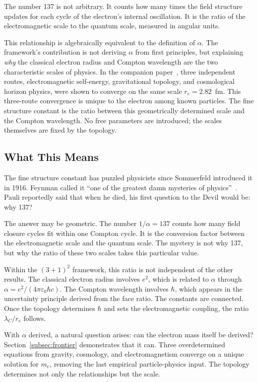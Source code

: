 \documentclass[aps,prd,preprint,superscriptaddress,showpacs,preprintnumbers,amsmath,amssymb,nofootinbib]{revtex4-2}
\begin{document}
The number 137 is not arbitrary. It counts how many times the field structure updates for each cycle of the electron's internal oscillation. It is the ratio of the electromagnetic scale to the quantum scale, measured in angular units.

This relationship is algebraically equivalent to the definition of $\alpha$. The framework's contribution is not deriving $\alpha$ from first principles, but explaining \emph{why} the classical electron radius and Compton wavelength are the two characteristic scales of physics. In the companion paper~\cite{paper5}, three independent routes, electromagnetic self-energy, gravitational topology, and cosmological horizon physics, were shown to converge on the same scale $r_e = 2.82$~fm. This three-route convergence is unique to the electron among known particles. The fine structure constant is the ratio between this geometrically determined scale and the Compton wavelength. No free parameters are introduced; the scales themselves are fixed by the topology.

\subsection{What This Means}
\label{subsec:alpha-meaning}

The fine structure constant has puzzled physicists since Sommerfeld introduced it in 1916. Feynman called it ``one of the greatest damn mysteries of physics''~\cite{feynman1985}. Pauli reportedly said that when he died, his first question to the Devil would be: why 137?

The answer may be geometric. The number $1/\alpha = 137$ counts how many field closure cycles fit within one Compton cycle. It is the conversion factor between the electromagnetic scale and the quantum scale. The mystery is not why 137, but why the ratio of these two scales takes this particular value.

Within the $(3+1)^2$ framework, this ratio is not independent of the other results. The classical electron radius involves $e^2$, which is related to $\alpha$ through $\alpha = e^2/(4\pi\varepsilon_0 \hbar c)$. The Compton wavelength involves $\hbar$, which appears in the uncertainty principle derived from the face ratio. The constants are connected. Once the topology determines $\hbar$ and sets the electromagnetic coupling, the ratio $\lambda_C/r_e$ follows.

With $\alpha$ derived, a natural question arises: can the electron mass itself be derived? Section~\ref{subsec:frontier} demonstrates that it can. Three overdetermined equations from gravity, cosmology, and electromagnetism converge on a unique solution for $m_e$, removing the last empirical particle-physics input. The topology determines not only the relationships but the scale.
\end{document}
